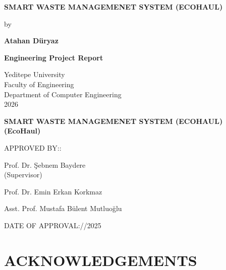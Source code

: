 \documentclass[12pt,a4paper]{report}
\begin{document}

\begin{titlepage}
\thispagestyle{empty}
\centering
\vspace*{2cm}
{\large\bfseries
SMART WASTE MANAGEMENET SYSTEM
(ECOHAUL)\par}
\vspace{4cm}
{\normalsize by
\\[0.4cm]}
{\large\bfseries Atahan Düryaz\par}
\vspace{4cm}
{\large\bfseries Engineering Project Report
\par}
\vspace{3cm}
{\normalsize
Yeditepe University\\
Faculty of Engineering\\
Department of Computer Engineering\\
2026\par}
\end{titlepage}

\clearpage\thispagestyle{empty}\phantom{x}\clearpage
\setcounter{page}{2}

\thispagestyle{plain}
\begin{center}
{\large\bfseries
SMART WASTE MANAGEMENET SYSTEM (ECOHAUL)
(EcoHaul)\par}
\end{center}
\vspace{2cm}
\noindent APPROVED BY::
\vspace{1.2cm}

\noindent Prof. Dr. \c{S}ebnem Baydere \dotfill\\
(Supervisor)

\vspace{0.9cm}
\noindent Prof. Dr. Emin Erkan Korkmaz \dotfill

\vspace{0.9cm}
\noindent Asst. Prof. Mustafa Bülent Mutluoğlu \dotfill

\vfill
\noindent DATE OF APPROVAL:\quad /\quad /2025
\clearpage

\chapter*{ACKNOWLEDGEMENTS}
\end{document}
